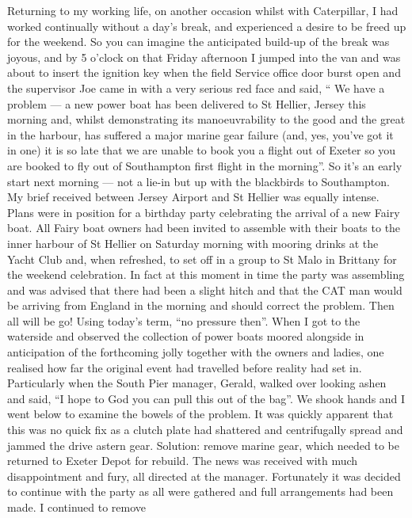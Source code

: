 
Returning to my working life, on another occasion whilst with Caterpillar, I had
worked continually without a day's break, and experienced a desire to be freed
up for the weekend. So you can imagine the anticipated build-up of the break
was joyous, and by 5 o'clock on that Friday afternoon I jumped into the van and
was about to insert the ignition key when the field Service office door burst
open and the supervisor Joe came in with a very serious red face and said, ``
We have a problem --- a new power boat has been delivered to St Hellier, Jersey
this morning and, whilst demonstrating its manoeuvrability to the good and the
great in the harbour, has suffered a major marine gear failure (and, yes,
you've got it in one) it is so late that we are unable to book you a flight out
of Exeter so you are booked to fly out of Southampton first flight in the
morning''. So it's an early start next morning --- not a lie-in but up with the
blackbirds to Southampton. My brief received between Jersey Airport and St
Hellier was equally intense. Plans were in position for a birthday party
celebrating the arrival of a new Fairy boat. All Fairy boat owners had been
invited to assemble with their boats to the inner harbour of St Hellier on
Saturday morning with mooring drinks at the Yacht Club and, when refreshed, to
set off in a group to St Malo in Brittany for the weekend celebration. In fact
at this moment in time the party was assembling and was advised that there had
been a slight hitch and that the CAT man would be arriving from England in the
morning and should correct the problem. Then all will be go! Using today's
term, ``no pressure then''. When I got to the waterside and observed the
collection of power boats moored alongside in anticipation of the forthcoming
jolly together with the owners and ladies, one realised how far the original
event had travelled before reality had set in. Particularly when the South Pier
manager, Gerald, walked over looking ashen and said, ``I hope to God you can
pull this out of the bag''. We shook hands and I went below to examine the
bowels of the problem. It was quickly apparent that this was no quick fix as a
clutch plate had shattered and centrifugally spread and jammed the drive astern
gear. Solution: remove marine gear, which needed to be returned to Exeter Depot
for rebuild. The news was received with much disappointment and fury, all
directed at the manager. Fortunately it was decided to continue with the party
as all were gathered and full arrangements had been made. I continued to remove
